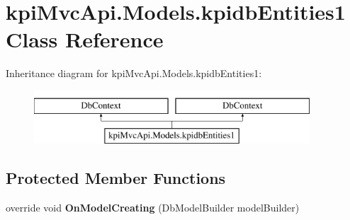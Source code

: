 \hypertarget{classkpi_mvc_api_1_1_models_1_1kpidb_entities1}{}\section{kpi\+Mvc\+Api.\+Models.\+kpidb\+Entities1 Class Reference}
\label{classkpi_mvc_api_1_1_models_1_1kpidb_entities1}
Inheritance diagram for kpi\+Mvc\+Api.\+Models.\+kpidb\+Entities1\+:\begin{figure}[H]
\begin{center}
\leavevmode
\includegraphics[height=2.000000cm]{classkpi_mvc_api_1_1_models_1_1kpidb_entities1}
\end{center}
\end{figure}
\subsection*{Protected Member Functions}
\begin{DoxyCompactItemize}
\item 
\mbox{\label{classkpi_mvc_api_1_1_models_1_1kpidb_entities1_a08bd4559ef70af9b3d494f820e87f8f2}} 
override void {\bfseries On\+Model\+Creating} (Db\+Model\+Builder model\+Builder)
\end{DoxyCompactItemize}
